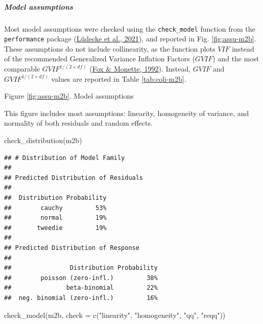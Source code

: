 \documentclass[
  bookmarksnumbered]{article}
\newenvironment{Shaded}{\begin{snugshade}}{\end{snugshade}}
\newcommand{\AttributeTok}[1]{\textcolor[rgb]{0.80,0.80,0.80}{#1}}
\newcommand{\FunctionTok}[1]{\textcolor[rgb]{0.94,0.94,0.56}{#1}}
\newcommand{\NormalTok}[1]{\textcolor[rgb]{0.80,0.80,0.80}{#1}}
\newcommand{\StringTok}[1]{\textcolor[rgb]{0.80,0.58,0.58}{#1}}
\begin{document}
\hypertarget{model-assumptions-2}{%
\subparagraph{Model assumptions}\label{model-assumptions-2}}

Most model assumptions were checked using the \texttt{check\_model} function from the \texttt{performance} package (\protect\hyperlink{ref-ludecke2021}{Lüdecke et al., 2021}), and reported in Fig. \ref{fig:assu-m2b}. These assumptions do not include collinearity, as the function plots \(VIF\) instead of the recommended Generalized Variance Inflation Factors (\(GVIF\)) and the most comparable \(GVIF^{{1}/{(2 \times df)}}\) (\protect\hyperlink{ref-fox1992}{Fox \& Monette, 1992}). Instead, \(GVIF\) and \(GVIF^{{1}/{(2 \times df)}}\) values are reported in Table \ref{tab:coli-m2b}.

Figure \ref{fig:assu-m2b}. Model assumptions

This figure includes most assumptions: linearity, homogeneity of variance, and normality of both residuals and random effects.

\begin{Shaded}
\begin{Highlighting}[]
\FunctionTok{check\_distribution}\NormalTok{(m2b)}
\end{Highlighting}
\end{Shaded}

\begin{verbatim}
## # Distribution of Model Family
## 
## Predicted Distribution of Residuals
## 
##  Distribution Probability
##        cauchy         53%
##        normal         19%
##       tweedie         19%
## 
## Predicted Distribution of Response
## 
##                Distribution Probability
##        poisson (zero-infl.)         38%
##               beta-binomial         22%
##  neg. binomial (zero-infl.)         16%
\end{verbatim}

\begin{Shaded}
\begin{Highlighting}[]
\FunctionTok{check\_model}\NormalTok{(m2b,}
            \AttributeTok{check =} \FunctionTok{c}\NormalTok{(}\StringTok{"linearity"}\NormalTok{, }\StringTok{"homogeneity"}\NormalTok{, }\StringTok{"qq"}\NormalTok{, }\StringTok{"reqq"}\NormalTok{))}
\end{Highlighting}
\end{Shaded}
\end{document}
